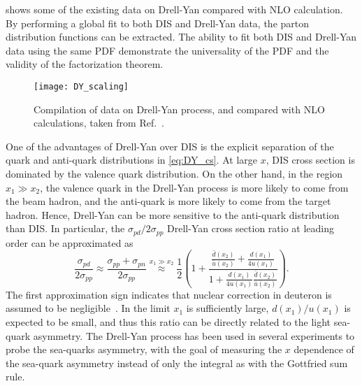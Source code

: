 \documentclass[../main.tex]{subfiles}
\begin{document}
 shows some of the existing data on Drell-Yan compared with NLO calculation. By
performing a global fit to both DIS and Drell-Yan data, the parton distribution
functions can be extracted. The ability to fit both DIS and Drell-Yan data using
the same PDF demonstrate the universality of the PDF and the validity of the
factorization theorem.
\begin{figure}[htbp!]
	\centering
	\texttt{[image: DY\_scaling]}
	\caption{Compilation of data on Drell-Yan process, and compared with NLO calculations,
		taken from Ref.~\cite{mcgaughey1999}.}
	\label{fig:DY_scaling}
\end{figure}

One of the advantages of Drell-Yan over DIS is the explicit separation of the quark
and anti-quark distributions in \cref{eq:DY_cs}. At large $x$, DIS cross section
is dominated by the valence quark distribution. On the other hand, in the region $x_1 \gg x_2$,
the valence quark in the Drell-Yan process is more likely to come from the beam
hadron, and the anti-quark is more likely to come from the target hadron. Hence,
Drell-Yan can be more sensitive to the anti-quark distribution than DIS. In
particular, the $\sigma_{pd}/2\sigma_{pp}$ Drell-Yan cross section ratio at leading order
can be approximated as
\begin{equation}
	\frac{\sigma_{pd}}{2\sigma_{pp}}\approx \frac{\sigma_{pp}+\sigma_{pn}}{2\sigma_{pp}}
	\stackrel{x_1\gg x_2}{\approx} \frac{1}{2} \left( 1+ \frac{\frac{\bar{d}\left(x_2\right)}{\bar{u}\left(x_2\right)} + \frac{d\left(x_1\right)}{4u\left(x_1\right)} }{1+\frac{d\left(x_1\right)}{4u\left(x_1\right)} \frac{\bar{d}\left(x_2\right)}{\bar{u}\left(x_2\right)} }\right).
\end{equation}
The first approximation sign indicates that nuclear correction in deuteron is assumed to be negligible~\cite{ehlers2014}.
In the limit $x_1$ is sufficiently large, $d\left(x_1\right)/u\left(x_1\right)$ is expected
to be small, and thus this ratio can be directly related to the light sea-quark
asymmetry. The Drell-Yan process has been used in several experiments to probe the sea-quarks
asymmetry, with the goal of measuring the $x$ dependence of the sea-quark asymmetry
instead of only the integral as with the Gottfried sum rule.
\end{document}
